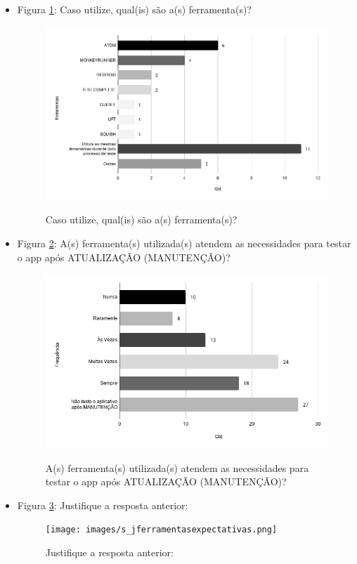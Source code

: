 \begin{itemize}
    
    \item Figura \ref{figure:s_ferramentastestenovo}: Caso utilize, qual(is) são a(s) ferramenta(s)?
    \begin{figure}[!htb]
    \centering
    \includegraphics[width=.55\textwidth]{images/s_ferramentastestenovo.png}
    \label{figure:s_ferramentastestenovo}
    \caption{Caso utilize, qual(is) são a(s) ferramenta(s)?}
    \end{figure}
    
    
    \item Figura \ref{figure:s_ferramentasexpectativas}: A(s) ferramenta(s) utilizada(s) atendem as necessidades para testar o app após ATUALIZAÇÃO (MANUTENÇÃO)?
    \begin{figure}[!htb]
    \centering
    \includegraphics[width=.55\textwidth]{images/s_ferramentasexpectativas.png}
    \label{figure:s_ferramentasexpectativas}
    \caption{A(s) ferramenta(s) utilizada(s) atendem as necessidades para testar o app após ATUALIZAÇÃO (MANUTENÇÃO)?}
    \end{figure}
    
    
    \item Figura \ref{figure:s_jferramentasexpectativas}: Justifique a resposta anterior:
    \begin{figure}[!htb]
    \centering
    \texttt{[image: images/s\_jferramentasexpectativas.png]}
    \label{figure:s_jferramentasexpectativas}
    \caption{Justifique a resposta anterior:}
    \end{figure}
    

\end{itemize}
